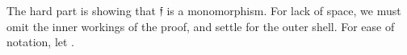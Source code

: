 \documentclass[a4paper,UKenglish,cleveref,autoref,thm-restate]{lipics-v2021}
\begin{document}
\begin{code}
\>[1]\AgdaSpace{}%
\AgdaSymbol{:}\AgdaSpace{}%
\AgdaSpace{}%
\AgdaSpace{}%
\AgdaSpace{}%
\AgdaSpace{}%
\<%
\\
%
\>[1]\AgdaSpace{}%
\AgdaSpace{}%
\AgdaSymbol{=}\AgdaSpace{}%
\AgdaSpace{}%
\AgdaSpace{}%
\AgdaSpace{}%
\AgdaSymbol{(}\AgdaSpace{}%
\AgdaSymbol{(}\AgdaSpace{}%
\AgdaSymbol{(}\AgdaSpace{}%
\AgdaSymbol{)))}\AgdaSpace{}%
\<%
\\
%
\>[1]\AgdaSpace{}%
\AgdaSymbol{:}\AgdaSpace{}%
\AgdaSpace{}%
\AgdaSymbol{(}\AgdaSpace{}%
\AgdaSymbol{)}\AgdaSpace{}%
\<%
\\
%
\>[1]\AgdaSpace{}%
\AgdaSymbol{=}\AgdaSpace{}%
\AgdaSpace{}%
\AgdaSpace{}%
\<%
\\
%
\>[1]\AgdaSpace{}%
\AgdaSymbol{:}\AgdaSpace{}%
\AgdaSpace{}%
\AgdaSpace{}%
\<%
\\
%
\>[1]\AgdaSpace{}%
\AgdaSymbol{=}\AgdaSpace{}%
\AgdaSpace{}%
\AgdaSpace{}%
\AgdaSpace{}%
\AgdaOperator{\AgdaInductiveConstructor{,}}\AgdaSpace{}%
\AgdaSpace{}%
\AgdaSpace{}%
\AgdaSpace{}%
\AgdaSpace{}%
\AgdaSpace{}%
\AgdaSpace{}%
\AgdaSpace{}%
\AgdaSpace{}%
\AgdaSpace{}%
\AgdaSpace{}%
\AgdaSpace{}%
\AgdaSpace{}%
\AgdaSpace{}%
\AgdaSpace{}%
\AgdaSymbol{)}\<%
\end{code}
\ccpad
The hard part is showing that \af 𝔣 is a monomorphism. For lack of space, we must omit the inner workings of the proof, and settle for the outer shell. \seedocfordetails
For ease of notation, let \AgdaSpace{}\AgdaSymbol{=}\AgdaSpace{}\AgdaSpace{}.
\end{document}

